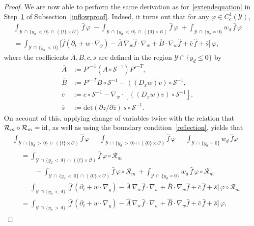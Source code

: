 \documentclass[AHL,Unicode,longabstracts,published]{cedram}
\newcommand*\p{\partial}
\renewcommand*\det{\mathrm{det}}
\newcommand*\Rm {\mathcal{R}_m}
\renewcommand*\SS {\mathcal{S}}
\newcommand*\Y {\mathcal{Y}}
\newcommand*\OO {\mathcal{O}}
\begin{document}
\begin{proof}
We are now able to perform the same derivation as for~\eqref{extendequation} in Step~\hyperref[step1]{1} of Subsection~\ref{inflowproof}. Indeed, it turns out that for any $\varphi\in C_c^1(\Y)$,
\begin{multline*}
\int_{\Y\,\cap\,\{y_d\,<\,0\}\,\cap\,(\{t\}\times\OO)} \widehat{f}\, \varphi\; -\int_{\Y\,\cap\,\{y_d\,<\,0\}\,\cap\,(\{0\}\times\OO)} \widehat{f}\, \varphi\; +\int_{\Y\,\cap\,\{y_d=0\}} w_d\,\widehat{f}\, \varphi\\
=\int_{\Y\,\cap\,\{y_d\,<\,0\}} \Big[\widehat{f}(\p_t+w\cdot\nabla_y) -\overline{A}\,\nabla_w\widehat{f}\cdot\nabla_w +\overline{B}\cdot\nabla_w \widehat{f} +\overline{c}\,\widehat{f} +\overline{s} \Big]\,\varphi,
\end{multline*}
where the coefficients $\overline{A},\overline{B},\overline{c},\overline{s}$ are defined in the region $\Y\cap\{y_d\le 0\}$ by
\begin{align*}
\overline{A}&:=P'^{-1}\left(A\circ\SS^{-1}\right) P'^{-T},\\
\overline{B}&:=P'^{-T} B\circ\SS^{-1}\! -((D_xw)v) \circ\SS^{-1},\\
\overline{c}&:=c \circ\SS^{-1}\! - \nabla_w\cdot\left[((D_xw)v) \circ\SS^{-1}\right],\\
\overline{s}&:=\det(\p z/\p \overline{z})\, s \circ\SS^{-1}.
\end{align*}
On account of this, applying change of variables twice with the relation that $\Rm\circ\Rm={\rm id}$, as well as using the boundary condition~\eqref{reflection}, yields that
\begin{multline*}
\int_{\Y\,\cap\,\{y_d\,>\,0\}\,\cap\,(\{t\}\times\OO)} \widehat{f}\, \varphi\; -\int_{\Y\,\cap\,\{y_d\,>\,0\}\cap(\{0\}\times\OO)} \widehat{f}\, \varphi\; -\int_{\Y\,\cap\,\{y_d=0\}} w_d\,\widehat{f} \varphi\\
\begin{aligned}
&=\int_{\Y\,\cap\,\{y_d\,<\,0\}\,\cap\,(\{t\}\times\OO)} \widehat{f}\, \varphi\circ\Rm\\
&\qquad -\int_{\Y\,\cap\,\{y_d\,<\,0\}\,\cap\,(\{0\}\times\OO)} \widehat{f}\, \varphi\circ\Rm\, +\int_{\Y\,\cap\,\{y_d=0\}} w_d\,\widehat{f}\, \varphi\circ\Rm\\
&=\int_{\Y\,\cap\,\{y_d\,<\,0\}} \Big[\widehat{f}\,(\p_t+w\cdot\nabla_y)-\overline{A}\,\nabla_w\widehat{f}\cdot\nabla_w +\overline{B}\cdot\nabla_w \widehat{f} +\overline{c}\,\widehat{f} +\overline{s} \Big]\, \varphi\circ\Rm\\
&=\int_{\Y\,\cap\,\{y_d\,>\,0\}} \Big[\widehat{f}\,(\p_t+w\cdot\nabla_y) -\widehat{A}\,\nabla_w\widehat{f}\cdot\nabla_w +\widehat{B}\cdot\nabla_w \widehat{f} +\widehat{c}\,\widehat{f}+\widehat{s} \Big]\, \varphi,

\end{aligned}
\end{multline*}
\end{proof}
\end{document}
